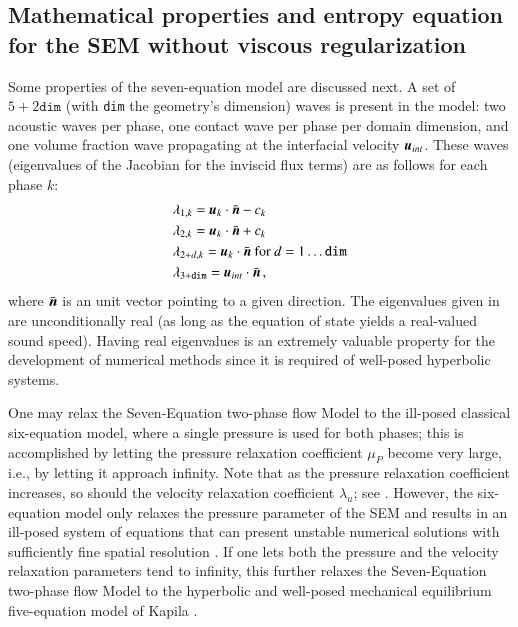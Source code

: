 \documentclass[preprint,10pt]{elsarticle}
\begin{document}
\subsection{Mathematical properties and entropy equation for the SEM without viscous regularization}\label{eq:sem-ent-wv}
Some properties of the seven-equation model are discussed next. A set of $5+2\texttt{dim}$ (with \texttt{dim} the geometry's dimension) waves 
is present in the model: two acoustic waves per phase, one contact wave per phase per domain dimension, and one volume fraction wave propagating 
at the interfacial velocity $\boldsymbol u_{int}$. These waves (eigenvalues of the Jacobian for the inviscid flux terms) are as follows for each phase $k$:
% 
\begin{align}\label{eq:eigenvalues}
&\lambda_{1,k} = \boldsymbol u_k \cdot \bar{\boldsymbol n} - c_k \nonumber\\
&\lambda_{2,k} = \boldsymbol u_k \cdot \bar{\boldsymbol n} + c_k \nonumber\\
&\lambda_{2+d,k} = \boldsymbol u_k \cdot \bar{\boldsymbol n} \text{ for } d = 1 \dots \texttt{dim} \\
&\lambda_{3+\texttt{dim}} = \boldsymbol u_{int} \cdot \bar{\boldsymbol n} \nonumber \,,
\end{align}
%
where $\bar{\boldsymbol n}$ is an unit vector pointing to a given direction. The eigenvalues given in  are unconditionally 
real (as long as the equation of state yields a real-valued sound speed). Having real eigenvalues is an extremely valuable property for 
the development of numerical methods since it is required of well-posed hyperbolic systems. 

One may relax the Seven-Equation two-phase flow Model to
the ill-posed classical six-equation model, where a single pressure 
is used for both phases; this is
accomplished by letting the pressure relaxation coefficient $\mu_P$ become
very large, i.e., by letting it approach infinity.  Note that as the pressure
relaxation coefficient increases, so should the velocity
relaxation coefficient $\lambda_u$; see . 
However, the six-equation model only relaxes the pressure parameter of the SEM and results
in an ill-posed system of equations that can present unstable numerical solutions
with sufficiently fine spatial resolution \cite{SEM,Herrard_2005}. 
%
If one lets both the pressure and the velocity relaxation parameters tend to infinity, this further relaxes the
Seven-Equation two-phase flow Model to the hyperbolic and well-posed 
mechanical equilibrium five-equation model of Kapila \cite{Kapila_2001}.  
\end{document}
